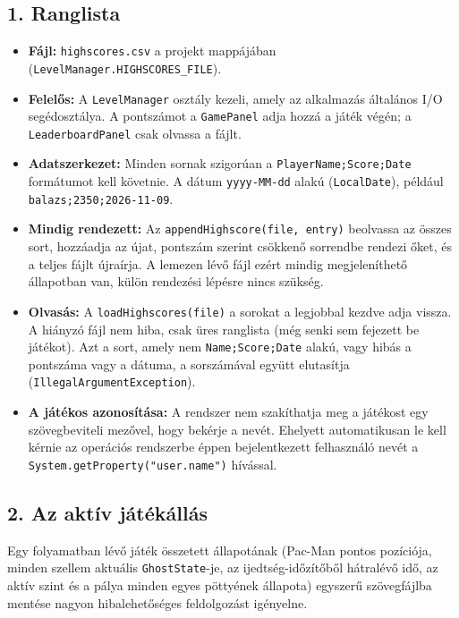\documentclass[11pt, a4paper]{article}
\begin{document}
\subsection*{1. Ranglista}
\begin{itemize}
    \item \textbf{Fájl:} \texttt{highscores.csv} a projekt mappájában (\texttt{LevelManager.HIGHSCORES\_FILE}).
    \item \textbf{Felelős:} A \texttt{LevelManager} osztály kezeli, amely az alkalmazás általános I/O segédosztálya. A pontszámot a \texttt{GamePanel} adja hozzá a játék végén; a \texttt{LeaderboardPanel} csak olvassa a fájlt.
    \item \textbf{Adatszerkezet:} Minden sornak szigorúan a \texttt{PlayerName;Score;Date} formátumot kell követnie. A dátum \texttt{yyyy-MM-dd} alakú (\texttt{LocalDate}), például \texttt{balazs;2350;2026-11-09}.
    \item \textbf{Mindig rendezett:} Az \texttt{appendHighscore(file, entry)} beolvassa az összes sort, hozzáadja az újat, pontszám szerint csökkenő sorrendbe rendezi őket, és a teljes fájlt újraírja. A lemezen lévő fájl ezért mindig megjeleníthető állapotban van, külön rendezési lépésre nincs szükség.
    \item \textbf{Olvasás:} A \texttt{loadHighscores(file)} a sorokat a legjobbal kezdve adja vissza. A hiányzó fájl nem hiba, csak üres ranglista (még senki sem fejezett be játékot). Azt a sort, amely nem \texttt{Name;Score;Date} alakú, vagy hibás a pontszáma vagy a dátuma, a sorszámával együtt elutasítja (\texttt{IllegalArgumentException}).
    \item \textbf{A játékos azonosítása:} A rendszer nem szakíthatja meg a játékost egy szövegbeviteli mezővel, hogy bekérje a nevét. Ehelyett automatikusan le kell kérnie az operációs rendszerbe éppen bejelentkezett felhasználó nevét a \texttt{System.getProperty("user.name")} hívással.
\end{itemize}

\subsection*{2. Az aktív játékállás}
Egy folyamatban lévő játék összetett állapotának (Pac-Man pontos pozíciója, minden szellem aktuális \texttt{GhostState}-je, az ijedtség-időzítőből hátralévő idő, az aktív szint és a pálya minden egyes pöttyének állapota) egyszerű szövegfájlba mentése nagyon hibalehetőséges feldolgozást igényelne.
\end{document}
